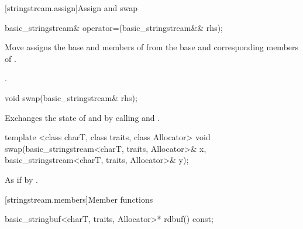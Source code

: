 [stringstream.assign]{Assign and swap}

%
%
\begin{itemdecl}
basic_stringstream& operator=(basic_stringstream&& rhs);
\end{itemdecl}

\begin{itemdescr}
\pnum
\effects Move assigns the base and members of  from the base and corresponding
members of .

\pnum
\returns {}.
\end{itemdescr}

%
%
\begin{itemdecl}
void swap(basic_stringstream& rhs);
\end{itemdecl}

\begin{itemdescr}
\pnum
\effects Exchanges the state of  and
 by calling
 and
.
\end{itemdescr}


%
%
\begin{itemdecl}
template <class charT, class traits, class Allocator>
  void swap(basic_stringstream<charT, traits, Allocator>& x,
            basic_stringstream<charT, traits, Allocator>& y);
\end{itemdecl}

\begin{itemdescr}
\pnum
\effects As if by .
\end{itemdescr}

[stringstream.members]{Member functions}

%
\begin{itemdecl}
basic_stringbuf<charT, traits, Allocator>* rdbuf() const;
\end{itemdecl}

\begin{itemdescr}
\pnum
\returns
{}
\end{itemdescr}

